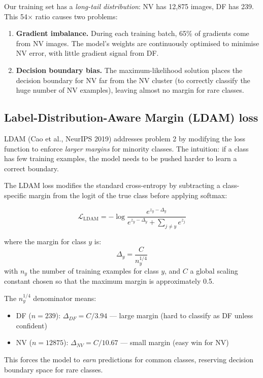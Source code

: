 \documentclass[12pt,a4paper]{article}
\begin{document}
Our training set has a \emph{long-tail distribution}: NV has 12,875 images, DF has 239.
This 54$\times$ ratio causes two problems:

\begin{enumerate}
  \item \textbf{Gradient imbalance.} During each training batch, 65\% of gradients come from
    NV images. The model's weights are continuously optimised to minimise NV error, with little
    gradient signal from DF.
  \item \textbf{Decision boundary bias.} The maximum-likelihood solution places the decision
    boundary for NV far from the NV cluster (to correctly classify the huge number of NV
    examples), leaving almost no margin for rare classes.
\end{enumerate}

\subsection{Label-Distribution-Aware Margin (LDAM) loss}

LDAM (Cao et al., NeurIPS 2019) addresses problem 2 by modifying the loss function to enforce
\emph{larger margins} for minority classes. The intuition: if a class has few training examples,
the model needs to be pushed harder to learn a correct boundary.

The LDAM loss modifies the standard cross-entropy by subtracting a class-specific margin from
the logit of the true class before applying softmax:

\[
\mathcal{L}_{\text{LDAM}} = -\log \frac{e^{z_y - \Delta_y}}{e^{z_y - \Delta_y} + \sum_{j \neq y} e^{z_j}}
\]

where the margin for class $y$ is:
\[
\Delta_y = \frac{C}{n_y^{1/4}}
\]
with $n_y$ the number of training examples for class $y$, and $C$ a global scaling constant
chosen so that the maximum margin is approximately 0.5.

The $n_y^{1/4}$ denominator means:
\begin{itemize}
  \item DF ($n = 239$): $\Delta_{DF} = C / 3.94$ --- large margin (hard to classify as DF unless confident)
  \item NV ($n = 12875$): $\Delta_{NV} = C / 10.67$ --- small margin (easy win for NV)
\end{itemize}

This forces the model to \emph{earn} predictions for common classes, reserving decision boundary
space for rare classes.
\end{document}
